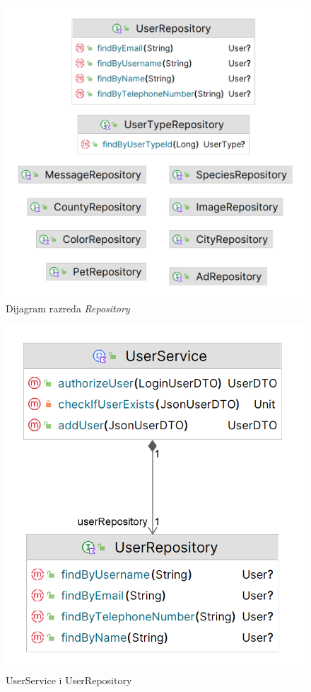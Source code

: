 			\begin{figure}[H]
				\includegraphics[scale=0.2]{slike/dijagram_repository.PNG} 
				\centering
				\caption{Dijagram razreda \textit{Repository}}
				\label{dijagram_repository}
			\end{figure}
			
			\begin{figure}[H]
				\includegraphics[scale=0.3]{slike/dijagram_user_service_repository.PNG} 
				\centering
				\caption{UserService i UserRepository}
				\label{dijagram_user_service_repository}
			\end{figure}
			
